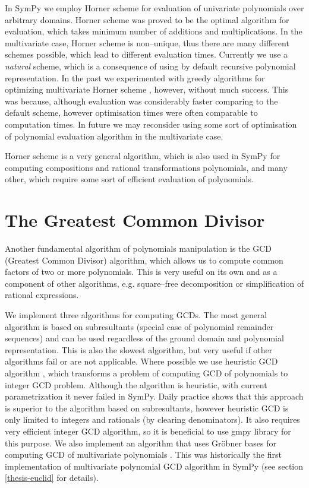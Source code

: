 In SymPy we employ Horner scheme \cite{Geddes1992algorithms} for evaluation of univariate polynomials
over arbitrary domains. Horner scheme was proved to be the optimal algorithm for evaluation, which
takes minimum number of additions and multiplications. In the multivariate case, Horner scheme is
non--unique, thus there are many different schemes possible, which lead to different evaluation
times. Currently we use a \emph{natural} scheme, which is a consequence of using by default recursive
polynomial representation. In the past we experimented with greedy algorithms for optimizing
multivariate Horner scheme \cite{Ceberio2004greedy}, however, without much success. This was because,
although evaluation was considerably faster comparing to the default scheme, however optimisation
times were often comparable to computation times. In future we may reconsider using some sort of
optimisation of polynomial evaluation algorithm in the multivariate case.

Horner scheme is a very general algorithm, which is also used in SymPy for computing compositions
and rational transformations polynomials, and many other, which require some sort of efficient
evaluation of polynomials.


\section{The Greatest Common Divisor}

Another fundamental algorithm of polynomials manipulation is the GCD (Greatest Common Divisor)
algorithm, which allows us to compute common factors of two or more polynomials. This is very
useful on its own and as a component of other algorithms, e.g. square--free decomposition or
simplification of rational expressions.

We implement three algorithms for computing GCDs. The most general algorithm is based on
subresultants (special case of polynomial remainder sequences) and can be used regardless
of the ground domain and polynomial representation. This is also the slowest algorithm, but
very useful if other algorithms fail or are not applicable. Where possible we use heuristic
GCD algorithm \cite{Liao1995heuristic}, which transforms a problem of computing GCD of polynomials
to integer GCD problem. Although the algorithm is heuristic, with current parametrization it
never failed in SymPy. Daily practice shows that this approach is superior to the algorithm
based on subresultants, however heuristic GCD is only limited to integers and rationals (by
clearing denominators). It also requires very efficient integer GCD algorithm, so it is
beneficial to use gmpy library for this purpose. We also implement an algorithm that uses
Gröbner bases for computing GCD of multivariate polynomials \cite{Cox1997ideals}. This was
historically the first implementation of multivariate polynomial GCD algorithm in SymPy
(see section \ref{thesis-euclid} for details).

